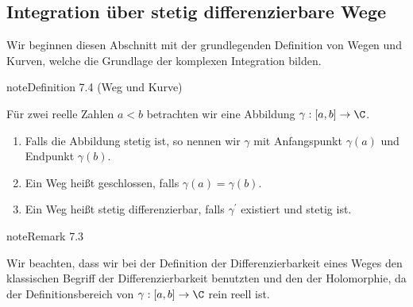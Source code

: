 \documentclass[letterpaper,10pt,german]{jupyterBook}
\begin{document}
\subsection{Integration über stetig differenzierbare Wege}
\label{\detokenize{complexanalysis/kurvenintegrale:integration-uber-stetig-differenzierbare-wege}}
\sphinxAtStartPar
Wir beginnen diesen Abschnitt mit der grundlegenden Definition von Wegen und Kurven, welche die Grundlage der komplexen Integration bilden.
\label{complexanalysis/kurvenintegrale:definition-1}
\begin{sphinxadmonition}{note}{Definition 7.4 (Weg und Kurve)}



\sphinxAtStartPar
Für zwei reelle Zahlen \(a<b\) betrachten wir eine Abbildung \(\gamma:[a,b]\to\C\).
\begin{enumerate}
%
\item {} 
\sphinxAtStartPar
Falls die Abbildung stetig ist, so nennen wir \(\gamma\)  mit Anfangspunkt \(\gamma(a)\) und Endpunkt \(\gamma(b)\).

\item {} 
\sphinxAtStartPar
Ein Weg heißt geschlossen, falls \(\gamma(a)=\gamma(b)\).

\item {} 
\sphinxAtStartPar
Ein Weg heißt stetig differenzierbar, falls \(\gamma^\prime\) existiert und stetig ist.

\end{enumerate}
\end{sphinxadmonition}
\label{complexanalysis/kurvenintegrale:remark-2}
\begin{sphinxadmonition}{note}{Remark 7.3}



\sphinxAtStartPar
Wir beachten, dass wir bei der Definition der Differenzierbarkeit eines Weges den klassischen Begriff der Differenzierbarkeit benutzten und  den der Holomorphie, da der Definitionsbereich von \(\gamma:[a,b]\to\C\) rein reell ist.
\end{sphinxadmonition}
\end{document}
